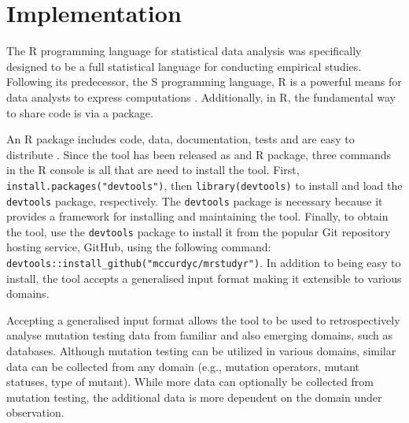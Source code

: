 \section{Implementation}

The R programming language for statistical data analysis was specifically designed to
be a full statistical language for conducting empirical studies. Following its predecessor, the S programming
language, R is a powerful means for data analysts to express computations \cite{ihaka1996r}.
Additionally, in R, the fundamental way to share code is via a package.

An R package includes code, data, documentation, tests and are easy to distribute \cite{wickham2015r}.
Since the \mr tool has been released as and R package, three commands in the R console
is all that are need to install the tool.
First, \texttt{install.packages("devtools")}, then \texttt{library(devtools)}
to install and load the \texttt{devtools}\cite{devtools} package, respectively.
The \texttt{devtools} package is necessary because it provides a framework for installing
and maintaining the tool. Finally, to obtain the
\mr\hspace*{-1em}\cite{mrstudyr} tool, use the \texttt{devtools} package to install it
from the popular Git repository hosting service, GitHub\cite{github},
using the following command: {\small\texttt{devtools::install\_github("mccurdyc/mrstudyr")}}.
In addition to being easy to install, the \mr tool accepts a generalised input format making
it extensible to various domains.

Accepting a generalised input format allows the \mr tool to be used to retrospectively analyse mutation testing
data from familiar and also emerging domains, such as databases. Although mutation
testing can be utilized in various domains, similar data can be collected from any
domain (e.g., mutation operators, mutant statuses, type of mutant). While more data
can optionally be collected from mutation testing, the additional data is more
dependent on the domain under observation.




